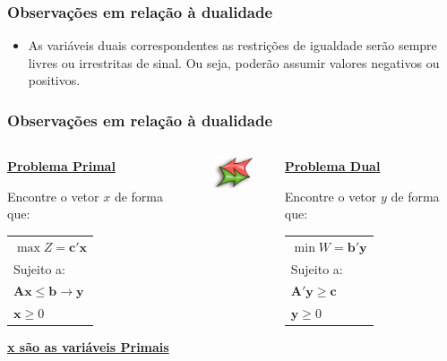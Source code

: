 \documentclass{beamer}
\begin{document}
\begin{frame}
	\frametitle{Observações em relação à dualidade} 
	\begin{itemize}
		\item As variáveis duais correspondentes as restrições de igualdade serão sempre livres ou irrestritas de sinal. Ou seja, poderão assumir valores negativos ou positivos.
	\end{itemize}
\end{frame}

\begin{frame}
	\frametitle{Observações em relação à dualidade} 
	\begin{columns}
		\centering
		\scriptsize
		\begin{column}{4cm}
			\underline{\textbf{Problema Primal}}
			\begin{mdframed}[backgroundcolor=blue!50]
				Encontre o vetor \textbf{$x$} de forma que:
				\begin{table}
					\begin{tabular}{l}
						$ \max Z = \mathbf{c'x}$ \\
						Sujeito a: \\
						$ \mathbf{{Ax}} \le \mathbf{b} \rightarrow \mathbf{y} $ \\
						$ \mathbf{x} \ge 0$ \\
					\end{tabular}
				\end{table}
			\end{mdframed}
			\underline{\textbf{x são as variáveis Primais}}
		\end{column}
		\begin{column}{2cm}
			\includegraphics[width=2cm,height=0.9cm]{bi-directional_arrow.png}
		\end{column}
		\begin{column}{4cm}
			\underline{\textbf{Problema Dual}}
			\begin{mdframed}[backgroundcolor=red!50]
				Encontre o vetor \textbf{$y$} de forma que:
				\begin{table}
					\begin{tabular}{l}
						$ \min W = \mathbf{b'y} $ \\
						Sujeito a: \\
						$ \mathbf{A'y} \ge \mathbf{c}$ \\
						$ \mathbf{y} \ge 0$ \\

\end{tabular}
\end{table}
\end{mdframed}
\end{column}
\end{columns}
\end{frame}
\end{document}
